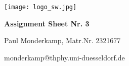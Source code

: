 \documentclass[12pt,a4paper]{article}	%
\newcommand{\x}{\textbf}
\begin{document}
\setcounter{section}{2}

\setlength{\parindent}{0pt}


\thispagestyle{empty}

\begin{titlepage}
	\centering
	\texttt{[image: logo\_sw.jpg]}\par\vspace{1cm}
	\vspace{1cm}
	\vspace{1.5cm}
	{\LARGE\bfseries Assignment Sheet Nr. 3\\  \par}
	\vspace{1cm}
	
	{\large	Paul Monderkamp, Matr.Nr. 2321677\par}
	\vfill
	

	\vfill

	{\large  monderkamp@thphy.uni-duesseldorf.de \par}
	\vspace{2cm}
\end{titlepage}

\thispagestyle{empty} %
\newpage	%

%
\end{document}
